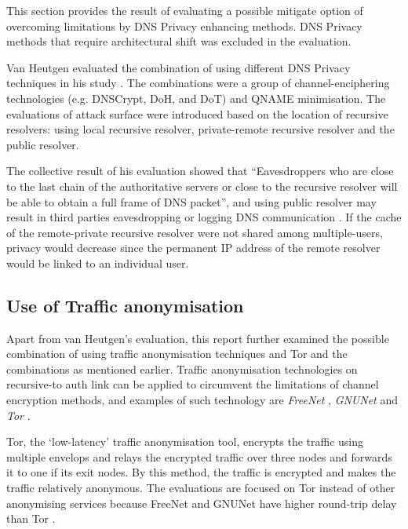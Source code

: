 This section provides the result of evaluating a possible mitigate option of overcoming limitations by DNS Privacy enhancing methods.
DNS Privacy methods that require architectural shift was excluded in the evaluation.

Van Heutgen evaluated the combination of using different DNS Privacy techniques in his study \cite{van2018privacy}.
The combinations were a group of channel-enciphering technologies (e.g. DNSCrypt, DoH, and DoT) and QNAME minimisation.
The evaluations of attack surface were introduced based on the location of recursive resolvers: using local recursive resolver, private-remote recursive resolver and the public resolver.

The collective result of his evaluation showed that ``Eavesdroppers who are close to the last chain of the authoritative servers or close to the recursive resolver will be able to obtain a full frame of DNS packet'', and using public resolver may result in third parties eavesdropping or logging DNS communication \cite{van2018privacy}.
If the cache of the remote-private recursive resolver were not shared among multiple-users, privacy would decrease since the permanent IP address of the remote resolver would be linked to an individual user.

\subsection{Use of Traffic anonymisation}
Apart from van Heutgen’s evaluation, this report further examined the possible combination of using traffic anonymisation techniques and Tor and the combinations as mentioned earlier.
Traffic anonymisation technologies on recursive-to auth link can be applied to circumvent the limitations of channel encryption methods, and examples of such technology are \textit{FreeNet} \cite{clarke2001freenet}, \textit{GNUNet} \cite{grothoff2017gnunet} and \textit{Tor} \cite{dingledine2004tor}.

Tor, the `low-latency' traffic anonymisation tool, encrypts the traffic using multiple envelops and relays the encrypted traffic over three nodes and forwards it to one if its exit nodes.
By this method, the traffic is encrypted and makes the traffic relatively anonymous.
The evaluations are focused on Tor instead of other anonymising services because FreeNet and GNUNet have higher round-trip delay than Tor \cite{anonymousoverdns}.

